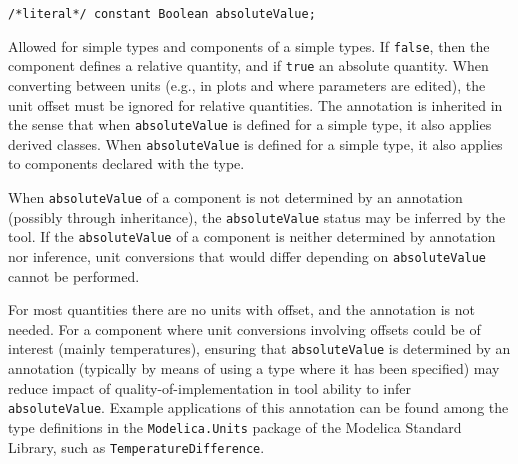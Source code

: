 \begin{annotationdefinition}[absoluteValue]
\begin{synopsis}\begin{lstlisting}
/*literal*/ constant Boolean absoluteValue;
\end{lstlisting}\end{synopsis}
\begin{semantics}
Allowed for simple types and components of a simple types.
If \lstinline!false!, then the component defines a relative quantity, and if \lstinline!true! an absolute quantity.
When converting between units (e.g., in plots and where parameters are edited), the unit offset must be ignored for relative quantities.
The annotation is inherited in the sense that when \lstinline!absoluteValue! is defined for a simple type, it also applies derived classes.
When \lstinline!absoluteValue! is defined for a simple type, it also applies to components declared with the type.

When \lstinline!absoluteValue! of a component is not determined by an annotation (possibly through inheritance), the \lstinline!absoluteValue! status may be inferred by the tool.
If the \lstinline!absoluteValue! of a component is neither determined by annotation nor inference, unit conversions that would differ depending on \lstinline!absoluteValue! cannot be performed.

\begin{nonnormative}
For most quantities there are no units with offset, and the annotation is not needed.
For a component where unit conversions involving offsets could be of interest (mainly temperatures), ensuring that \lstinline!absoluteValue! is determined by an annotation (typically by means of using a type where it has been specified) may reduce impact of quality-of-implementation in tool ability to infer \lstinline!absoluteValue!.
Example applications of this annotation can be found among the type definitions in the \lstinline!Modelica.Units! package of the Modelica Standard Library, such as \lstinline!TemperatureDifference!.
\end{nonnormative}
\end{semantics}
\end{annotationdefinition}

